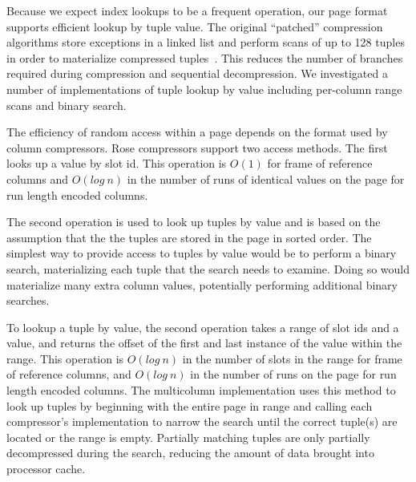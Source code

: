 \documentclass{vldb}
\newcommand{\rows}{Rose\xspace}
\begin{document}
Because we expect index lookups to be a frequent operation, our
page format supports efficient lookup by tuple value.  The original
``patched'' compression algorithms store exceptions in a linked list
and perform scans of up to 128 tuples in order to materialize compressed
tuples~\cite{pfor}.  This reduces the number of branches
required during compression and sequential decompression.  We
investigated a number of implementations of tuple lookup by value
including per-column range scans and binary search.

The efficiency of random access within a
page depends on the format used by column compressors.  \rows
compressors support two access methods.  The first looks up a value by
slot id.  This operation is $O(1)$ for frame of reference columns and
$O(log~n)$ in the number of runs of identical values on the page for
run length encoded columns.

The second operation is used to look up tuples by value and is based
on the assumption that the the tuples are stored in the
page in sorted order.  The simplest way to provide access to tuples by
value would be to perform a binary search, materializing each tuple
that the search needs to examine.  Doing so would materialize many
extra column values, potentially performing additional binary searches.

To lookup a tuple by value, the second operation takes a range of slot
ids and a value, and returns the offset of the first and last instance
of the value within the range.  This operation is $O(log~n)$ in the
number of slots in the range for frame of reference columns, and
$O(log~n)$ in the number of runs on the page for run length encoded
columns.  The multicolumn implementation uses this method to look up
tuples by beginning with the entire page in range and calling each
compressor's implementation to narrow the search until the
correct tuple(s) are located or the range is empty.
Partially matching tuples are only partially decompressed during the
search, reducing the amount of data brought into processor cache.
\end{document}
